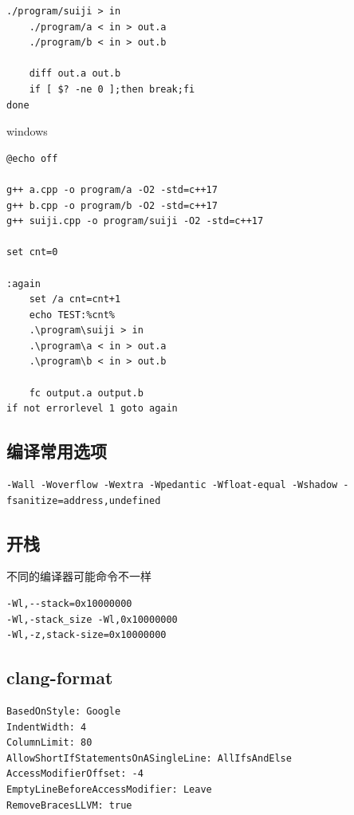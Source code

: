 \documentclass[UTF8]{ctexart}
\begin{document}
\begin{sloppypar}
\begin{lstlisting}[style=cpp]
    ./program/suiji > in
    ./program/a < in > out.a
    ./program/b < in > out.b

    diff out.a out.b
    if [ $? -ne 0 ];then break;fi
done
\end{lstlisting}

windows

\begin{lstlisting}[style=cpp]
@echo off

g++ a.cpp -o program/a -O2 -std=c++17
g++ b.cpp -o program/b -O2 -std=c++17
g++ suiji.cpp -o program/suiji -O2 -std=c++17

set cnt=0

:again
    set /a cnt=cnt+1
    echo TEST:%cnt%
    .\program\suiji > in
    .\program\a < in > out.a
    .\program\b < in > out.b

    fc output.a output.b
if not errorlevel 1 goto again
\end{lstlisting}

\subsection{编译常用选项}

\begin{lstlisting}[style=cpp]
-Wall -Woverflow -Wextra -Wpedantic -Wfloat-equal -Wshadow -fsanitize=address,undefined
\end{lstlisting}

\subsection{开栈}

不同的编译器可能命令不一样

\begin{lstlisting}[style=cpp]
-Wl,--stack=0x10000000
-Wl,-stack_size -Wl,0x10000000
-Wl,-z,stack-size=0x10000000
\end{lstlisting}

\subsection{clang-format}

\begin{lstlisting}[style=cpp]
BasedOnStyle: Google
IndentWidth: 4
ColumnLimit: 80
AllowShortIfStatementsOnASingleLine: AllIfsAndElse
AccessModifierOffset: -4
EmptyLineBeforeAccessModifier: Leave
RemoveBracesLLVM: true
\end{lstlisting}

\end{sloppypar}
\end{document}
